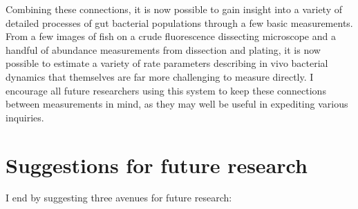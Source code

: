 Combining these connections, it is now possible to gain insight into a variety of detailed processes of gut bacterial populations through a few basic measurements. From a few images of fish on a crude fluorescence dissecting microscope and a handful of abundance measurements from dissection and plating, it is now possible to estimate a variety of rate parameters describing in vivo bacterial dynamics that themselves are far more challenging to measure directly. I encourage all future researchers using this system to keep these connections between measurements in mind, as they may well be useful in expediting various inquiries.

\section{Suggestions for future research}

I end by suggesting three avenues for future research:

